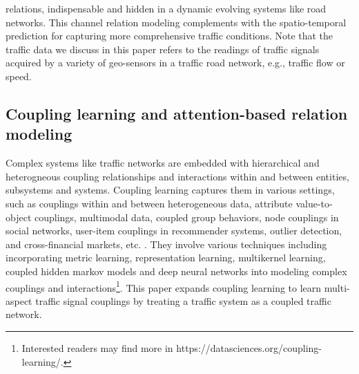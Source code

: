 relations, indispensable and hidden in a dynamic evolving systems like road  networks. This channel relation modeling complements with the spatio-temporal prediction for capturing more comprehensive traffic conditions. Note that the traffic data we discuss in this paper refers to the readings of traffic signals acquired by a variety of geo-sensors in a traffic road network, e.g., traffic flow or speed. 

\subsection{Coupling learning and attention-based relation modeling}
Complex systems like traffic networks are embedded with hierarchical and heterogneous coupling relationships and interactions within and between entities, subsystems and systems. Coupling learning captures them in various settings, such as couplings within and between heterogeneous data, attribute value-to-object couplings, multimodal data, coupled group behaviors, node couplings in social networks, user-item couplings in recommender systems, outlier detection, and cross-financial markets, etc. \cite{2015Coupling,cao2016non,Huaaai19,zhu2020unsupervised,WangGC21,2018CoupledCF}. They involve various techniques including incorporating metric learning, representation learning, multikernel learning, coupled hidden markov models and deep neural networks into modeling complex couplings and interactions\footnote{Interested readers may find more in https://datasciences.org/coupling-learning/.}. This paper expands coupling learning to learn multi-aspect traffic signal couplings by treating a traffic system as a coupled traffic network.


